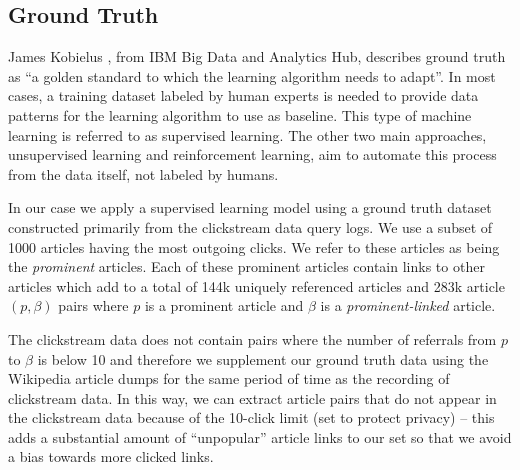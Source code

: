 \subsection{Ground Truth}
\label{sec:groundtruth}

James Kobielus \cite{kobielus}, from IBM Big Data and Analytics Hub, describes ground truth as ``a golden standard to which the learning algorithm needs to adapt''. In most cases, a training dataset labeled by human experts is needed to provide data patterns for the learning algorithm to use as baseline. This type of machine learning is referred to as supervised learning. The other two main approaches, unsupervised learning and reinforcement learning, aim to automate this process from the data itself, not labeled by humans.

In our case we apply a supervised learning model using a ground truth dataset constructed primarily from the clickstream data query logs. We use a subset of 1000 articles having the most outgoing clicks. We refer to these articles as being the \textit{prominent} articles. Each of these prominent articles contain links to other articles which add to a total of 144k uniquely referenced articles and 283k article $(p,\beta)$ pairs where $p$ is a prominent article and $\beta$ is a \textit{prominent-linked} article.



The clickstream data does not contain pairs where the number of referrals from $p$ to $\beta$ is below 10 and therefore we supplement our ground truth data using the Wikipedia article dumps for the same period of time as the recording of clickstream data. In this way, we can extract article pairs that do not appear in the clickstream data because of the 10-click limit (set to protect privacy) -- this adds a substantial amount of ``unpopular'' article links to our set so that we avoid a bias towards more clicked links.